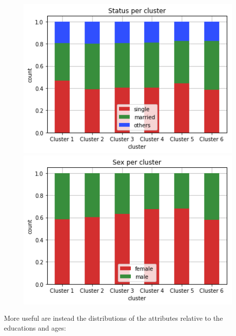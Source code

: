 \begin{figure}[h]
  \begin{minipage}[h]{.50\textwidth}
    \includegraphics[width=1\textwidth]{img/ch3/kmeans_status}
  \end{minipage}
  \begin{minipage}[h]{.50\textwidth}    
    \includegraphics[width=1\textwidth]{img/ch3/kmeans_sex}
  \end{minipage}
\end{figure}

More useful are instead the distributions of the attributes relative to the educations and ages:

